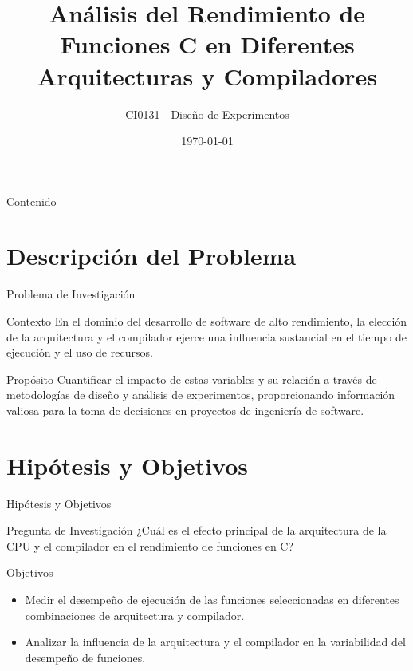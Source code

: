 \documentclass[aspectratio=169]{beamer}
\title{Análisis del Rendimiento de Funciones C en Diferentes Arquitecturas y Compiladores}
\subtitle{CI0131 - Diseño de Experimentos}
\date{\today}
\institute{Universidad de Costa Rica}
\begin{document}
\begin{frame}
    \titlepage
\end{frame}

\begin{frame}{Contenido}
    \tableofcontents
\end{frame}

\section{Descripción del Problema}

\begin{frame}{Problema de Investigación}
    \begin{block}{Contexto}
        En el dominio del desarrollo de software de alto rendimiento, la elección de la arquitectura y el compilador ejerce una influencia sustancial en el tiempo de ejecución y el uso de recursos.
    \end{block}
    
    \begin{block}{Propósito}
        Cuantificar el impacto de estas variables y su relación a través de metodologías de diseño y análisis de experimentos, proporcionando información valiosa para la toma de decisiones en proyectos de ingeniería de software.
    \end{block}
\end{frame}

\section{Hipótesis y Objetivos}

\begin{frame}{Hipótesis y Objetivos}
    \begin{block}{Pregunta de Investigación}
        ¿Cuál es el efecto principal de la arquitectura de la CPU y el compilador en el rendimiento de funciones en C?
    \end{block}
    
    \begin{block}{Objetivos}
        \begin{itemize}
            \item Medir el desempeño de ejecución de las funciones seleccionadas en diferentes combinaciones de arquitectura y compilador.
            \item Analizar la influencia de la arquitectura y el compilador en la variabilidad del desempeño de funciones.
        \end{itemize}
    \end{block}
\end{frame}
\end{document}
